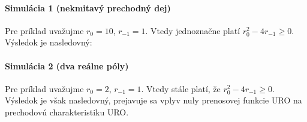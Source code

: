 \documentclass[a4paper, 10pt, ]{article}
\begin{document}
\paragraph{Simulácia 1 (nekmitavý prechodný dej)}

Pre príklad uvažujme $r_0 = 10$, $r_{-1} = 1$. Vtedy jednoznačne platí $r_0^2 - 4r_{-1} \geq 0$. Výsledok je nasledovný:

\begin{center}




    \figcaption{}

\end{center}


\paragraph{Simulácia 2 (dva reálne póly)}

Pre príklad uvažujme $r_0 = 2$, $r_{-1} = 1$. Vtedy stále platí, že $r_0^2 - 4r_{-1} \geq 0$. Výsledok je však nasledovný, prejavuje sa vplyv nuly prenosovej funkcie URO na prechodovú charakteristiku URO.




\begin{center}




    \figcaption{}

\end{center}
\end{document}
